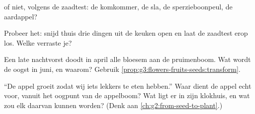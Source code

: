 \begin{exercise}[$\star$]\label{exo:g3:flowers-fruits-seeds:7}
 of niet, volgens de zaadtest: de komkommer, de sla, de
sperzieboonpeul, de aardappel?
\end{exercise}

\begin{exercise}[$\star$]\label{exo:g3:flowers-fruits-seeds:8}
Probeer het: snijd thuis drie dingen uit de keuken open en laat de
zaadtest erop los. Welke verraste je?
\end{exercise}

\begin{exercise}[$\star\star$]\label{exo:g3:flowers-fruits-seeds:9}
Een late nachtvorst doodt in april alle bloesem aan de pruimenboom. Wat
wordt de oogst in juni, en waarom? Gebruik
\cref{prop:g3:flowers-fruits-seeds:transform}.
\end{exercise}

\begin{exercise}[$\star\star$]\label{exo:g3:flowers-fruits-seeds:10}
``De appel groeit zodat wij iets lekkers te eten hebben.'' Waar dient
de appel echt voor, vanuit het oogpunt van de appelboom? Wat ligt er in
zijn klokhuis, en wat zou elk daarvan kunnen worden? (Denk aan
\cref{ch:g2:from-seed-to-plant}.)
\end{exercise}
